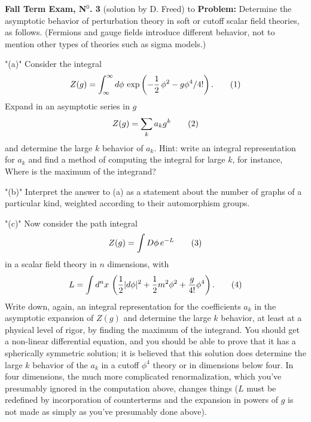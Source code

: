 
\nologo


\noindent
{\bf Fall Term Exam, N$^{\text{0}}$. 3}\qquad\qquad\qquad
\qquad\qquad\qquad\qquad\qquad(solution by D. Freed)
\smallskip
\hbox to \hsize{\hrulefill}
\bigskip
\noindent
{\bf Problem:}
\medskip
Determine the asymptotic behavior of perturbation theory in
soft or cutoff scalar field theories, as follows.
(Fermions and gauge fields introduce different behavior,
not to mention other types of theories such as sigma
models.)
\roster
\item"{(a)}"  Consider the integral
$$
Z(g)=\int\nolimits^\infty_\infty
d\phi\,\exp\left(-\frac{1}{2}\,\phi^2-g\phi^4\slash4!\right).
\tag1
$$
\endroster
\noindent
Expand in an asymptotic series in $g$
$$
Z(g)=\sum\limits_ka_kg^k\tag2
$$
and determine the large $k$ behavior of $a_k$.  Hint:
write an integral representation for $a_k$ and find a
method of computing the integral for large $k$, for
instance, Where is the maximum of the integrand?
\roster
\item"{(b)}"  Interpret the answer to (a) as a statement
about the number of graphs of a particular kind, weighted
according to their automorphism groups.
\smallskip
\item"{(c)}"  Now consider the path integral
$$
Z(g)=\int D\phi\,e^{-L}\tag3
$$
in a scalar field theory in $n$ dimensions, with
$$
L=\int
d^nx\,\left(\frac{1}{2}|d\phi|^2+\frac{1}{2}m^2\phi^2+\frac{g}
{4!}\phi^4\right).\tag4
$$
\endroster
\noindent
Write down, again, an integral representation for the
coefficients $a_k$ in the asymptotic expansion of $Z(g)$
and determine the large $k$ behavior, at least at a
physical level of rigor, by finding the maximum of the
integrand.
\medskip
You should get a non-linear differential equation, and you
should be able to prove that it has a spherically
symmetric solution; it is believed that this solution does
determine the large $k$ behavior of the $a_k$ in a cutoff
$\phi^4$ theory or in dimensions below four.  In four
dimensions, the much more complicated renormalization,
which you've presumably ignored in the computation above,
changes things ($L$ must be redefined by incorporation of
counterterms and the expansion in powers of $g$ is not made
as simply as you've presumably done above).
\vfill\eject


